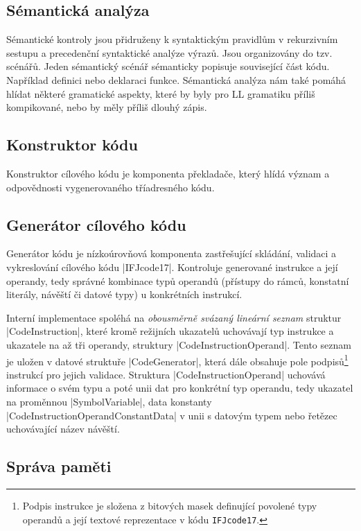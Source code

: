 \subsection{Sémantická analýza}
Sémantické kontroly jsou přidruženy k syntaktickým pravidlům v rekurzivním sestupu a
precedenční syntaktické analýze výrazů. Jsou organizovány do tzv. scénářů. Jeden
sémantický scénář sémanticky popisuje související část kódu. Například definici
nebo deklaraci funkce. Sémantická analýza nám také pomáhá hlídat některé gramatické aspekty,
které by byly pro LL gramatiku příliš kompikované, nebo by měly příliš dlouhý zápis.

\subsection{Konstruktor kódu}
\label{subsec:code-constructor}
Konstruktor cílového kódu je komponenta překladače, který hlídá význam a odpovědnosti vygenerovaného tříadresného kódu.

\subsection{Generátor cílového kódu}
Generátor kódu je nízkoúrovňová komponenta zastřešující skládání, validaci a vykreslování cílového kódu \ic|IFJcode17|.
Kontroluje generované instrukce a její operandy, tedy správné kombinace typů operandů (přístupy do rámců, konstatní
literály, návěští či datové typy) u konkrétních instrukcí.

Interní implementace spoléhá na \emph{obousměrně svázaný lineární seznam} struktur \ic|CodeInstruction|, které kromě
režijních ukazatelů uchovávají typ instrukce a ukazatele na až tři operandy, struktury \ic|CodeInstructionOperand|.
Tento seznam je uložen v datové struktuře \ic|CodeGenerator|, která dále obsahuje pole podpisů\footnote{Podpis
instrukce je složena z bitových masek definující povolené typy operandů a její textové reprezentace v kódu
\texttt{IFJcode17}.} instrukcí pro jejich validace.
Struktura \ic|CodeInstructionOperand| uchovává informace o svém typu a poté unii dat pro konkrétní typ operandu, tedy
ukazatel na proměnnou \ic|SymbolVariable|,
data konstanty \ic|CodeInstructionOperandConstantData| v unii s datovým typem nebo řetězec uchovávající název návěští.

\subsection{Správa paměti}

